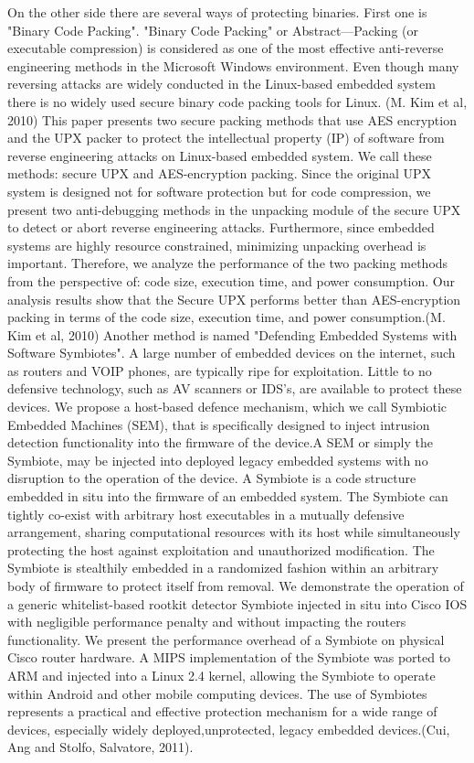 \documentclass[]{report}
\begin{document}
\begin{center}
On the other side there are several ways of protecting binaries. First one is "Binary Code Packing".
"Binary Code Packing" or Abstract—Packing (or executable compression) is considered as
one of the most effective anti-reverse engineering methods in
the Microsoft Windows environment. Even though many
reversing attacks are widely conducted in the Linux-based
embedded system there is no widely used secure binary code
packing tools for Linux. (M. Kim et al, 2010)
This paper presents two secure
packing methods that use AES encryption and the UPX packer
to protect the intellectual property (IP) of software from
reverse engineering attacks on Linux-based embedded system.
We call these methods: secure UPX and AES-encryption
packing. Since the original UPX system is designed not for
software protection but for code compression, we present two
anti-debugging methods in the unpacking module of the secure
UPX to detect or abort reverse engineering attacks.
Furthermore, since embedded systems are highly resource
constrained, minimizing unpacking overhead is important.
Therefore, we analyze the performance of the two packing
methods from the perspective of: code size, execution
time, and power consumption. Our analysis results show
that the Secure UPX performs better than AES-encryption
packing in terms of the code size, execution time, and power
consumption.(M. Kim et al, 2010)
\newline						
Another method is named "Defending Embedded Systems with Software Symbiotes".
A large number of embedded devices on the internet, such as routers and VOIP phones, are typically ripe for exploitation. Little to no defensive technology, such as AV scanners or IDS’s, are available to protect these devices. We propose a host-based defence mechanism, which we call Symbiotic Embedded Machines (SEM), that is speciﬁcally designed to inject intrusion detection functionality into the ﬁrmware of the device.A SEM or simply the Symbiote, may be injected into deployed legacy embedded systems with no disruption to the operation of the device. A Symbiote is a code structure embedded in situ into the ﬁrmware of an embedded system. The Symbiote can tightly co-exist with arbitrary host executables in a mutually defensive arrangement, sharing computational resources with its host while simultaneously protecting the host against exploitation and unauthorized modification. The Symbiote is stealthily embedded in a randomized fashion within an arbitrary body of ﬁrmware to protect itself from removal. We demonstrate the operation of a generic whitelist-based rootkit detector Symbiote injected in situ into Cisco IOS with negligible performance penalty and without impacting the routers functionality. We present the performance overhead of a Symbiote on physical Cisco router hardware. A MIPS implementation of the Symbiote was ported to ARM and injected into a Linux 2.4 kernel, allowing the Symbiote to operate within Android and other mobile computing devices. The use of Symbiotes represents a practical and eﬀective protection mechanism for a wide range of devices, especially widely deployed,unprotected, legacy embedded devices.(Cui, Ang and Stolfo, Salvatore, 2011).


\end{center}
\end{document}

